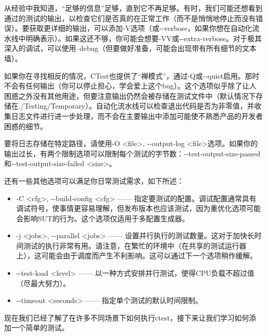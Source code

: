 从经验中我知道，“足够的信息”足够，直到它不再足够。有时，我们可能还想看到通过的测试的输出，以检查它们是否真的在正常工作（而不是悄悄地停止而没有错误）。要获取更详细的输出，可以添加-V选项（或-{}-verbose，如果你想在自动化流水线中明确表示）。如果这还不够，你可能会想要-VV或-{}-extra-verbose。对于极其深入的调试，可以使用–debug（但要做好准备，可能会出现带有所有细节的文本墙）。

如果你在寻找相反的情况，CTest也提供了“禅模式”，通过-Q或-{}-quiet启用。那时不会有任何输出（你可以停止担心，学会爱上这个bug）。这个选项似乎除了让人困惑之外没有其他用途，但要注意输出仍然会被存储在测试文件中（默认情况下存储在./Testing/Temporary）。自动化流水线可以检查退出代码是否为非零值，并收集日志文件进行进一步处理，而不会在主要输出中添加可能使不熟悉产品的开发者困惑的细节。

要将日志存储在特定路径，请使用-O <file>, -{}-output-log <file>选项。如果你的输出过长，有两个限制选项可以限制每个测试的字节数：-{}-test-output-size-passed 和-{}-test-output-size-failed <size>。


还有一些其他选项可以满足你日常测试需求，如下所述：

\begin{itemize}
\item
-C <cfg>, -{}-build-config <cfg> —— 指定要测试的配置。调试配置通常具有调试符号，使事情更容易理解，但发布版本也应该测试，因为重优化选项可能会影响SUT的行为。这个选项仅适用于多配置生成器。

\item
-j <jobs>, -{}-parallel <jobs> —— 设置并行执行的测试数量。这对于加快长时间测试的执行非常有用。请注意，在繁忙的环境中（在共享的测试运行器上），这可能会由于调度而产生不利影响。这可以通过下一个选项稍作缓解。

\item
-{}-test-load <level> —— 以一种方式安排并行测试，使得CPU负载不超过值（尽最大努力）。

\item
-{}-timeout <seconds> —— 指定单个测试的默认时间限制。
\end{itemize}

现在我们已经了解了在许多不同场景下如何执行ctest，接下来让我们学习如何添加一个简单的测试。



